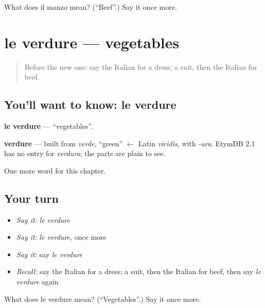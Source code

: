 \begin{tcolorbox}[breakable,colback=teal!4,colframe=teal!35!black,title={Before you move on}]
What does il manzo mean? (\textquotedblleft{}Beef\textquotedblright{}.) Say it once more.
\end{tcolorbox}
\section[le verdure]{le verdure — vegetables}

\label{lesson:IT-C106-verdure}



\begin{quote}
Before the new one: say the Italian for a dress; a suit, then the Italian for beef.
\end{quote}

\subsection*{You'll want to know: le verdure}
\textbf{le verdure} — \textquotedblleft{}vegetables\textquotedblright{}.

\begin{cousinweb}
\textbf{verdure} — built from \emph{verde}, \textquotedblleft{}green\textquotedblright{} $\leftarrow$ Latin \emph{viridis}, with \emph{-ura}. EtymDB 2.1 has no entry for \emph{verdura}; the parts are plain to see.
\end{cousinweb}

\begin{grammarlens}[title={What you've built}]
One more word for this chapter.
\end{grammarlens}

\subsection*{Your turn}
\begin{itemize}
\raggedright
  \item \emph{Say it:} \emph{le verdure}
  \item \emph{Say it:} \emph{le verdure}, once more
  \item \emph{Say it:} say \emph{le verdure}
  \item \emph{Recall:} say the Italian for a dress; a suit, then the Italian for beef, then say \emph{le verdure} again
\end{itemize}

\begin{tcolorbox}[breakable,colback=teal!4,colframe=teal!35!black,title={Before you move on}]
What does le verdure mean? (\textquotedblleft{}Vegetables\textquotedblright{}.) Say it once more.
\end{tcolorbox}
